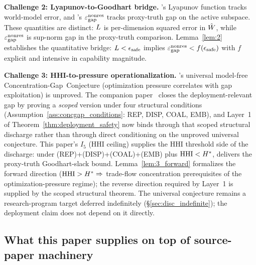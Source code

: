 \textbf{Challenge 2: Lyapunov-to-Goodhart bridge.}  \citep[Phase~Redundancy]{lasser2026phase}'s
Lyapunov function tracks world-model error, and \citep[Microfoundation]{lasser2026micro}'s $\varepsilon_{\mathrm{gap}}^{\mathrm{nonres}}$
tracks proxy-truth gap on the active subspace. These quantities are
distinct: $L$ is per-dimension squared error in $\hat{W}$, while
$\varepsilon_{\mathrm{gap}}^{\mathrm{nonres}}$ is sup-norm gap in the proxy-truth comparison.
Lemma~\ref{lem:2} establishes the quantitative bridge:
$L < \epsilon_{\mathrm{safe}}$ implies $\varepsilon_{\mathrm{gap}}^{\mathrm{nonres}} < f(\epsilon_{\mathrm{safe}})$
with $f$ explicit and intensive in capability magnitude.

\textbf{Challenge 3: HHI-to-pressure operationalization.}  \citep[Microfoundation]{lasser2026micro}'s
universal model-free Concentration-Gap~Conjecture (optimization
pressure correlates with gap exploitation) is unproved. The
companion paper~\citep{lasser2026foundations} closes the
deployment-relevant gap by proving a \emph{scoped} version
under four structural conditions
(Assumption~\ref{ass:concgap_conditions}: REP, DISP, COAL,
EMB), and Layer~1 of Theorem~\ref{thm:deployment_safety} now
binds through that scoped structural discharge rather than
through direct conditioning on the unproved universal conjecture.
This paper's $I_5$ (HHI ceiling) supplies the HHI threshold
side of the discharge: under (REP)+(DISP)+(COAL)+(EMB) plus
$\mathrm{HHI} < H^*$, \citep[Theorem~2]{lasser2026foundations} delivers
the proxy-truth Goodhart-slack bound. Lemma~\ref{lem:3_forward}
formalizes the forward direction
($\mathrm{HHI} > H^* \Rightarrow$ trade-flow concentration prerequisites
of the optimization-pressure regime); the reverse direction
required by Layer~1 is supplied by the scoped structural
theorem. The universal conjecture remains a research-program
target deferred
indefinitely (\S\ref{sec:disc_indefinite}); the deployment
claim does not depend on it directly.

\subsection{What this paper supplies on top of source-paper machinery}
\label{sec:paper10_new}

